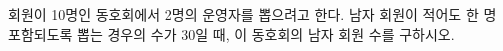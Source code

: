 \hspace*{2mm}\begin{minipage}[t]{\dimexpr\linewidth-2mm\relax}\vspace{0pt}
회원이 10명인 동호회에서 2명의 운영자를 뽑으려고 한다. 남자 회원이 적어도 한 명 포함되도록 뽑는 경우의 수가 30일 때, 이 동호회의 남자 회원 수를 구하시오.\end{minipage}
